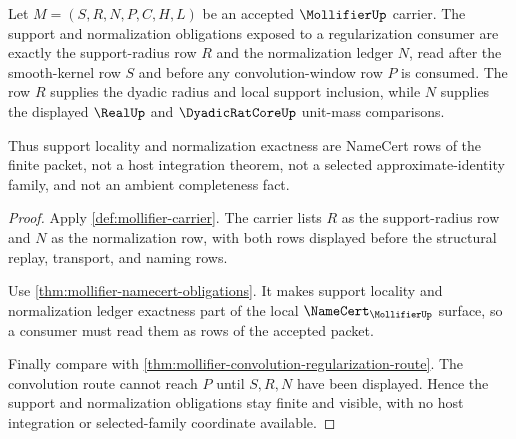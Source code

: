 \begin{theorem}
\label{thm:mollifier-support-normalization-obligation}
Let $M=(S,R,N,P,C,H,L)$ be an accepted $\MollifierUp$ carrier. The support and normalization obligations exposed to a regularization consumer are exactly the support-radius row $R$ and the normalization ledger $N$, read after the smooth-kernel row $S$ and before any convolution-window row $P$ is consumed. The row $R$ supplies the dyadic radius and local support inclusion, while $N$ supplies the displayed $\RealUp$ and $\DyadicRatCoreUp$ unit-mass comparisons.

Thus support locality and normalization exactness are NameCert rows of the finite packet, not a host integration theorem, not a selected approximate-identity family, and not an ambient completeness fact.
\end{theorem}
\begin{proof}
Apply \autoref{def:mollifier-carrier}. The carrier lists $R$ as the support-radius row and $N$ as the normalization row, with both rows displayed before the structural replay, transport, and naming rows.

Use \autoref{thm:mollifier-namecert-obligations}. It makes support locality and normalization ledger exactness part of the local $\NameCert_{\MollifierUp}$ surface, so a consumer must read them as rows of the accepted packet.

Finally compare with \autoref{thm:mollifier-convolution-regularization-route}. The convolution route cannot reach $P$ until $S,R,N$ have been displayed. Hence the support and normalization obligations stay finite and visible, with no host integration or selected-family coordinate available.
\end{proof}

